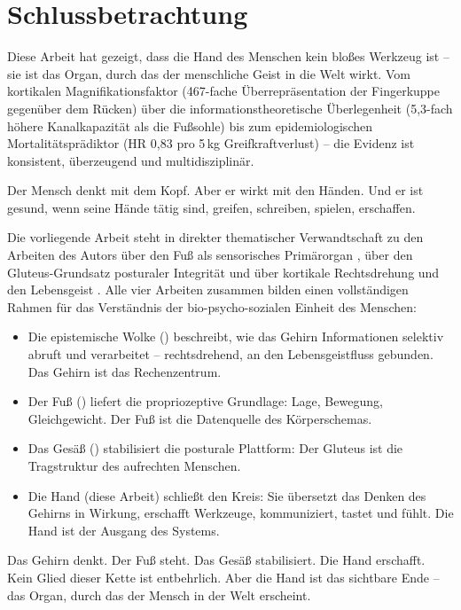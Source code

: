 ﻿\documentclass[12pt,a4paper]{report}
\theoremstyle{plain}
\theoremstyle{definition}
\theoremstyle{remark}
\begin{document}
\section{Schlussbetrachtung}

Diese Arbeit hat gezeigt, dass die Hand des Menschen kein bloßes Werkzeug
ist -- sie ist das Organ, durch das der menschliche Geist in die Welt wirkt.
Vom kortikalen Magnifikationsfaktor (467-fache Überrepräsentation der
Fingerkuppe gegenüber dem Rücken) über die informationstheoretische
Überlegenheit (5{,}3-fach höhere Kanalkapazität als die Fußsohle) bis zum
epidemiologischen Mortalitätsprädiktor (HR 0{,}83 pro 5\,kg Greifkraftverlust)
-- die Evidenz ist konsistent, überzeugend und multidisziplinär.

Der Mensch denkt mit dem Kopf. Aber er wirkt mit den Händen. Und er ist
gesund, wenn seine Hände tätig sind, greifen, schreiben, spielen, erschaffen.

Die vorliegende Arbeit steht in direkter thematischer Verwandtschaft
zu den Arbeiten des Autors über den Fuß als sensorisches Primärorgan
\cite{epp2026feed}, über den Gluteus-Grundsatz posturaler Integrität
\cite{epp2026butt} und über kortikale Rechtsdrehung und den Lebensgeist
\cite{epp2026brn}. Alle vier Arbeiten zusammen bilden einen vollständigen
Rahmen für das Verständnis der bio-psycho-sozialen Einheit des Menschen:

\begin{itemize}
\item Die epistemische Wolke (\cite{epp2026brn}) beschreibt, wie das
  Gehirn Informationen selektiv abruft und verarbeitet -- rechtsdrehend,
  an den Lebensgeistfluss gebunden. Das Gehirn ist das Rechenzentrum.
\item Der Fuß (\cite{epp2026feed}) liefert die propriozeptive Grundlage:
  Lage, Bewegung, Gleichgewicht. Der Fuß ist die
  Datenquelle des Körperschemas.
\item Das Gesäß (\cite{epp2026butt}) stabilisiert die posturale Plattform:
  Der Gluteus ist die Tragstruktur des aufrechten Menschen.
\item Die Hand (diese Arbeit) schließt den Kreis: Sie übersetzt das
  Denken des Gehirns in Wirkung, erschafft Werkzeuge, kommuniziert,
  tastet und fühlt. Die Hand ist der Ausgang des Systems.
\end{itemize}

Das Gehirn denkt. Der Fuß steht. Das Gesäß stabilisiert. Die Hand erschafft.
Kein Glied dieser Kette ist entbehrlich. Aber die Hand ist das sichtbare
Ende -- das Organ, durch das der Mensch in der Welt erscheint.
\end{document}
